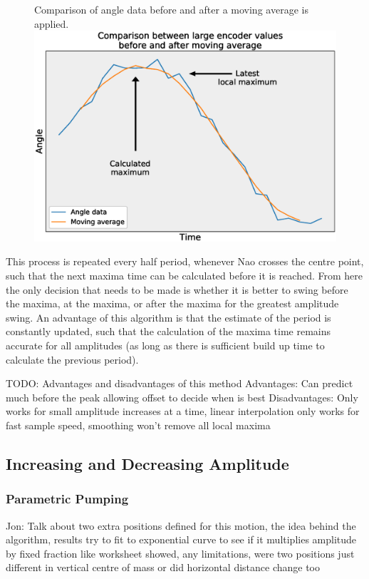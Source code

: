 \documentclass[11pt]{article}
\begin{document}
    \begin{figure}[!htb]
        \centering
        \captionbox
             {Comparison of angle data before and after a moving average is applied.\label{MovingAverageDiagram}}
             {\includegraphics[width=1.0\textwidth]{MovingAverageDiagram.eps}}
    \end{figure}


This process is repeated every half period, whenever Nao crosses the centre point, such that the next maxima time can be calculated before it is reached. From here the only decision that needs to be made is whether it is better to swing before the maxima, at the maxima, or after the maxima for the greatest amplitude swing. An advantage of this algorithm is that the estimate of the period is constantly updated, such that the calculation of the maxima time remains accurate for all amplitudes (as long as there is sufficient build up time to calculate the previous period).

TODO: Advantages and disadvantages of this method
Advantages: Can predict much before the peak allowing offset to decide when is best  
Disadvantages: Only works for small amplitude increases at a time, linear interpolation only works for fast sample speed, smoothing won't remove all local maxima

\subsection{Increasing and Decreasing Amplitude}


\subsubsection{Parametric Pumping}
Jon: Talk about two extra positions defined for this motion, the idea behind the algorithm, results try to fit to exponential curve to see if it multiplies amplitude by fixed fraction like worksheet showed, any limitations, were two positions just different in vertical centre of mass or did horizontal distance change too
\end{document}
